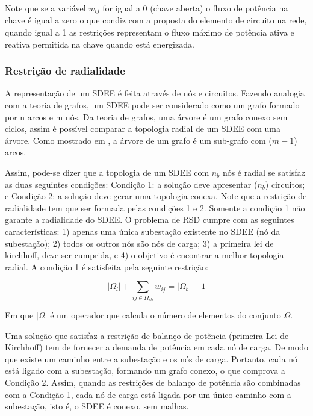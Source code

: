 Note que se a variável $w_{ij}$ for igual a 0 (chave aberta) o fluxo de potência na chave é igual a zero o que condiz com a proposta do elemento de circuito na rede, quando igual a 1 as restrições representam o fluxo máximo de potência ativa e reativa permitida na chave quando está energizada.

\subsubsection{Restrição de radialidade}

A representação de um SDEE é feita através de nós e circuitos. Fazendo analogia com a teoria de grafos, um SDEE pode ser considerado como um grafo formado por n arcos e m nós.
Da teoria de grafos, uma árvore é um grafo conexo sem ciclos, assim é possível comparar a topologia radial de um SDEE com uma árvore.
Como mostrado em \cite{Bazaraa1990LinearFlows}, a árvore de um grafo é um sub-grafo com ($m-1$) arcos.

Assim, pode-se dizer que a topologia de um SDEE com $n_{b}$ nós é radial se satisfaz as duas seguintes condições: Condição 1: a solução deve apresentar ($n_{b}$) circuitos; e Condição 2: a solução deve gerar uma topologia conexa. Note que a restrição de radialidade tem que ser formada pelas condições 1 e 2.
Somente a condição 1 não garante a radialidade do SDEE. O problema de RSD cumpre com as seguintes características: 1) apenas uma única subestação existente no SDEE (nó da subestação); 2) todos os outros nós são nós de carga; 3) a primeira lei de kirchhoff, deve ser cumprida, e 4) o objetivo é encontrar a melhor topologia radial. 
A condição 1 é satisfeita pela seguinte restrição:

\begin{equation}
    |\Omega_{l}| + \sum_{ij\in\Omega_{ch}}w_{ij} = |\Omega_{b}| - 1
    \label{eq:radialidade}
\end{equation}

Em que $|\Omega|$ é um operador que calcula o número de elementos do conjunto $\Omega$.

Uma solução que satisfaz a restrição de balanço de potência (primeira Lei de Kirchhoff) tem de fornecer a demanda de potência em cada nó de carga. De modo que existe um caminho entre a subestação e os nós de carga. Portanto, cada nó está ligado com a subestação, formando um grafo conexo, o que comprova a Condição 2. 
Assim, quando as restrições de balanço de potência são combinadas com a Condição 1, cada nó de carga está ligada por um único caminho com a subestação, isto é, o SDEE é conexo, sem malhas.

